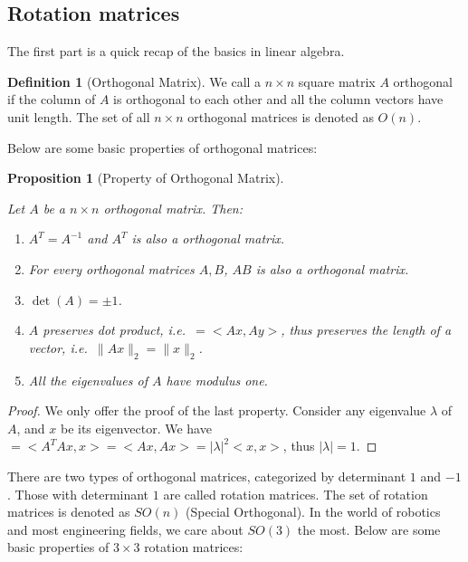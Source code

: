 \documentclass[
]{book}
\newtheorem{proposition}{Proposition}[chapter]
\theoremstyle{definition}
\newtheorem{definition}{Definition}[chapter]
\theoremstyle{definition}
\theoremstyle{definition}
\theoremstyle{definition}
\theoremstyle{remark}
\begin{document}
\hypertarget{rotation-matrices}{%
\subsection{Rotation matrices}\label{rotation-matrices}}

The first part is a quick recap of the basics in linear algebra.

\begin{definition}[Orthogonal Matrix]
\protect\hypertarget{def:orthogonalmatrix}{}\label{def:orthogonalmatrix}We call a \(n\times n\) square matrix \(A\) orthogonal if the column of \(A\) is orthogonal to each other and all the column vectors have unit length. The set of all \(n\times n\) orthogonal matrices is denoted as \(O(n)\).
\end{definition}

Below are some basic properties of orthogonal matrices:

\begin{proposition}[Property of Orthogonal Matrix]
\protect\hypertarget{prp:propertyoforthogonal}{}\label{prp:propertyoforthogonal}

Let \(A\) be a \(n\times n\) orthogonal matrix. Then:

\begin{enumerate}
\def\labelenumi{\arabic{enumi}.}
\item
  \(A^T = A^{-1}\) and \(A^T\) is also a orthogonal matrix.
\item
  For every orthogonal matrices \(A,B\), \(AB\) is also a orthogonal matrix.
\item
  \(\det(A) = \pm 1\).
\item
  \(A\) preserves dot product, i.e.~\(<x,y> = <Ax,Ay>\), thus preserves the length of a vector, i.e.~\(\|Ax\|_2 = \|x\|_2\).
\item
  All the eigenvalues of \(A\) have modulus one.
\end{enumerate}

\end{proposition}

\begin{proof}
We only offer the proof of the last property. Consider any eigenvalue \(\lambda\) of \(A\), and \(x\) be its eigenvector.
We have \(<x,x> = <A^TAx,x>=<Ax,Ax> = |\lambda|^2<x,x>\), thus \(|\lambda|=1\).
\end{proof}

There are two types of orthogonal matrices, categorized by determinant \(1\) and \(-1\). Those with determinant \(1\) are called rotation matrices. The set of rotation matrices is denoted as \(SO(n)\) (Special Orthogonal). In the world of robotics and most engineering fields, we care about \(SO(3)\) the most. Below are some basic properties of \(3\times 3\) rotation matrices:
\end{document}

